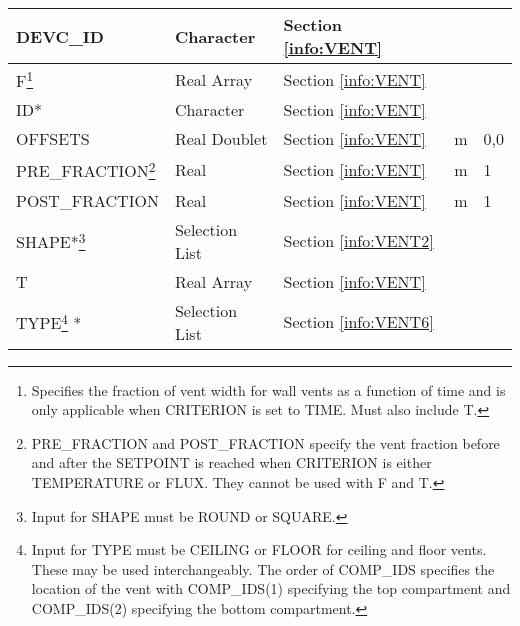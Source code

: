 \begin{minipage}{6.5in}
\begin{longtable}{@{\extracolsep{\fill}}|l|l|l|l|l|}
{\ct DEVC\_ID}           					 & Character  		  & Section \ref{info:VENT}      &                             &                 \\ \hline
{\ct F}\footnote{Specifies the fraction of vent width for wall vents as a function of time and is only applicable when {\ct CRITERION} is set to {\ct TIME}. Must also include T.}  					 & Real Array  		  & Section \ref{info:VENT}      &                             &                 \\ \hline
{\ct ID}*                                                         & Character  	          & Section \ref{info:VENT}      &                             &                 \\ \hline
{\ct OFFSETS}       					 & Real Doublet 		  & Section \ref{info:VENT}      & m                           &      0,0        \\ \hline
{\ct PRE\_FRACTION}\footnote{{\ct PRE\_FRACTION} and {\ct POST\_FRACTION} specify the vent fraction before and after the {\ct SETPOINT} is reached when {\ct CRITERION} is either {\ct TEMPERATURE} or {\ct FLUX}. They cannot be used with {\ct F} and {\ct T}.}       					 & Real 		  & Section \ref{info:VENT}      & m                           &      1        \\ \hline
{\ct POST\_FRACTION}       					 & Real 		  & Section \ref{info:VENT}      & m                           &      1        \\ \hline
{\ct SHAPE}*\footnote{Input for {\ct SHAPE} must be {\ct ROUND} or {\ct SQUARE}.}
                                                                 & Selection List         & Section \ref{info:VENT2}     &                             &                 \\ \hline
{\ct T}  					 & Real Array  		  & Section \ref{info:VENT}      &                             &                 \\ \hline
{\ct TYPE}\footnote{Input for {\ct TYPE} must be {\ct CEILING} or {\ct FLOOR} for ceiling and floor vents. These may be used interchangeably. The order of {\ct COMP\_IDS} specifies the location of the vent with {\ct COMP\_IDS(1)} specifying the top compartment and {\ct COMP\_IDS(2)} specifying the bottom compartment.} *
                                                                 & Selection List         & Section \ref{info:VENT6}     &                             &                 \\ \hline
\end{longtable}
\end{minipage}

